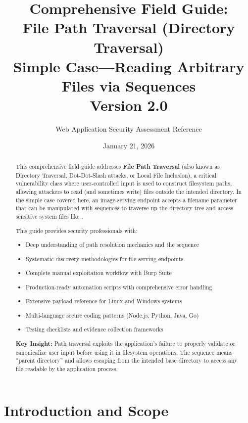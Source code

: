 \documentclass[11pt,letterpaper]{article}
\title{\textbf{Comprehensive Field Guide:\\File Path Traversal (Directory Traversal)}\\[0.5em]
\large Simple Case---Reading Arbitrary Files via \inlinecode{../} Sequences\\[0.3em]
\normalsize Version 2.0}
\author{Web Application Security Assessment Reference}
\date{January 21, 2026}
\newcommand{\inlinecode}[1]{\texttt{\detokenize{#1}}}
\begin{document}
\maketitle

\begin{abstract}
\noindent This comprehensive field guide addresses \textbf{File Path Traversal} (also known as Directory Traversal, Dot-Dot-Slash attacks, or Local File Inclusion), a critical vulnerability class where user-controlled input is used to construct filesystem paths, allowing attackers to read (and sometimes write) files outside the intended directory. In the simple case covered here, an image-serving endpoint accepts a filename parameter that can be manipulated with \inlinecode{../} sequences to traverse up the directory tree and access sensitive system files like \inlinecode{/etc/passwd}.

This guide provides security professionals with:
\begin{itemize}
  \item Deep understanding of path resolution mechanics and the \inlinecode{../} sequence
  \item Systematic discovery methodologies for file-serving endpoints
  \item Complete manual exploitation workflow with Burp Suite
  \item Production-ready automation scripts with comprehensive error handling
  \item Extensive payload reference for Linux and Windows systems
  \item Multi-language secure coding patterns (Node.js, Python, Java, Go)
  \item Testing checklists and evidence collection frameworks
\end{itemize}

\noindent\textbf{Key Insight:} Path traversal exploits the application's failure to properly validate or canonicalize user input before using it in filesystem operations. The \inlinecode{../} sequence means ``parent directory'' and allows escaping from the intended base directory to access any file readable by the application process.
\end{abstract}

\tableofcontents
\newpage

\section{Introduction and Scope}
\end{document}
